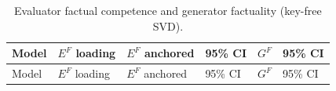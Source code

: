\protect{}\label{tab-criterion-a}{}

\begin{longtable}[]{@{}
  >{\raggedright\arraybackslash}p{}
  >{\raggedleft\arraybackslash}p{}
  >{\raggedleft\arraybackslash}p{}
  >{\raggedright\arraybackslash}p{}
  >{\raggedleft\arraybackslash}p{}
  >{\raggedright\arraybackslash}p{}@{}}
\caption{Evaluator factual competence and generator factuality (key-free SVD).}\tabularnewline
\toprule\noalign{}
\begin{minipage}[b]{\linewidth}\raggedright
Model
\end{minipage} & \begin{minipage}[b]{\linewidth}\raggedleft
\(E^{F}\) loading
\end{minipage} & \begin{minipage}[b]{\linewidth}\raggedleft
\(E^{F}\) anchored
\end{minipage} & \begin{minipage}[b]{\linewidth}\raggedright
95\% CI
\end{minipage} & \begin{minipage}[b]{\linewidth}\raggedleft
\(G^{F}\)
\end{minipage} & \begin{minipage}[b]{\linewidth}\raggedright
95\% CI
\end{minipage} \\
\midrule\noalign{}
\endfirsthead
\toprule\noalign{}
\begin{minipage}[b]{\linewidth}\raggedright
Model
\end{minipage} & \begin{minipage}[b]{\linewidth}\raggedleft
\(E^{F}\) loading
\end{minipage} & \begin{minipage}[b]{\linewidth}\raggedleft
\(E^{F}\) anchored
\end{minipage} & \begin{minipage}[b]{\linewidth}\raggedright
95\% CI
\end{minipage} & \begin{minipage}[b]{\linewidth}\raggedleft
\(G^{F}\)
\end{minipage} & \begin{minipage}[b]{\linewidth}\raggedright
95\% CI

\end{minipage}
\end{longtable}
